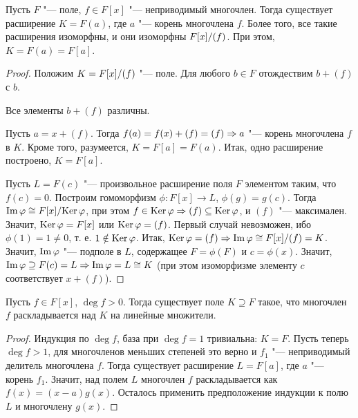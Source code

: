 \documentclass[main]{subfiles}
\begin{document}
\begin{proposition}
  Пусть \( F \) "--- поле, \( f \in F[x] \) "---
  неприводимый многочлен.
  Тогда существует расширение \( K = F(a) \),
  где \( a \) "--- корень многочлена \( f \).
  Более того, все такие расширения изоморфны, и
  они изоморфны \( \Factor{F[x]}[(f)] \).
  При этом, \( K = F(a) = F[a] \).
\end{proposition}
\begin{proof}
  Положим \( K = \Factor{F[x]}[(f)] \) "--- поле.
  Для любого \( b \in F \) отождествим \( b + (f) \)
  с \( b \).
  \begin{exercise}
    Все элементы \( b + (f) \) различны.
  \end{exercise}

  Пусть \( a = x + (f) \). Тогда
  \( f(a) = f(x) + (f) = (f) \Rightarrow a \) "--- корень
  многочлена \( f \) в \( K \).
  Кроме того, разумеется, \( K = F[a] = F(a) \).
  Итак, одно расширение построено, \( K = F[a] \).

  Пусть \( L = F(c) \) "--- произвольное расширение 
  поля \( F \) элементом таким, что \( f(c) = 0 \).
  Построим гомоморфизм \( \phi : F[x] \to L \),
  \( \phi(g) = g(c) \).
  Тогда \( \Img \phi \cong \Factor{F[x]}[\Ker \phi] \),
  при этом \( f \in \operatorname{Ker} \varphi \Rightarrow (f) \subseteq \operatorname{Ker} \varphi \),
  и \( (f) \) "--- максимален. Значит,
  \( \operatorname{Ker} \varphi = F[x] \) или \( \operatorname{Ker} \varphi = (f) \).
  Первый случай невозможен, ибо \( \phi(1) = 1 \ne 0 \),
  т. е. \( 1 \notin \operatorname{Ker} \varphi \).
  Итак, \( \Ker \phi = (f) \To \Img \phi \cong
  \Factor{F[x]}[(f)] = K \). Значит,
  \( \operatorname{Im} \varphi \) "--- подполе в \( L \), содержащее
  \( F = \phi(F) \) и \( c = \phi(x) \). Значит,
  \( \operatorname{Im} \varphi \supseteq F(c) = L \Rightarrow \operatorname{Im} \varphi = L \cong K \)
  (при этом изоморфизме элементу \( c \) соответствует
  \( x + (f) \)).
\end{proof}

\begin{corollary}
  Пусть \( f \in F[x] \), \( \deg f > 0 \).
  Тогда существует поле \( K \supseteq F \)
  такое, что многочлен \( f \) раскладывается
  над \( K \) на линейные множители.
\end{corollary}
\begin{proof}
  Индукция по \( \deg f \), база при \( \deg f = 1 \)
  тривиальна: \( K = F \).
  Пусть теперь \( \deg f > 1 \),
  для многочленов меньших степеней это верно
  и \( f_1 \) "--- неприводимый делитель многочлена
  \( f \). Тогда существует расширение \( L = F[a] \),
  где \( a \) "--- корень \( f_1 \).
  Значит, над полем \( L \) многочлен \( f \) раскладывается
  как \( f(x) = (x - a)g(x) \).
  Осталось применить предположение индукции к полю
  \( L \) и многочлену \( g(x) \).
\end{proof}
\end{document}
